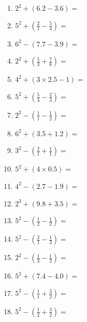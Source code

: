 \documentclass[12pt]{article}
\begin{document}
    \begin{enumerate}
\item \large $ 2^{2} + (6.2 - 3.6) = $ \vspace{1.4cm}
\item \large $ 5^{2} + (\frac{2}{1} - \frac{5}{4}) = $ \vspace{1.4cm}
\item \large $ 6^{2} - (7.7 - 3.9) = $ \vspace{1.4cm}
\item \large $ 2^{2} + (\frac{5}{3} + \frac{7}{6}) = $ \vspace{1.4cm}
\item \large $ 4^{2} + (3 \times 2.5 - 1) = $ \vspace{1.4cm}
\item \large $ 5^{2} + (\frac{5}{3} - \frac{2}{3}) = $ \vspace{1.4cm}
\item \large $ 2^{2} - (\frac{1}{1} - \frac{1}{2}) = $ \vspace{1.4cm}
\item \large $ 6^{2} + (3.5 + 1.2) = $ \vspace{1.4cm}
\newpage
\item \large $ 3^{2} - (\frac{2}{1} + \frac{1}{1}) = $ \vspace{1.4cm}
\item \large $ 5^{2} + (4 \times 0.5) = $ \vspace{1.4cm}
\item \large $ 4^{2} - (2.7 - 1.9) = $ \vspace{1.4cm}
\item \large $ 2^{3} + (9.8 + 3.5) = $ \vspace{1.4cm}
\item \large $ 5^{2} - (\frac{1}{2} - \frac{1}{2}) = $ \vspace{1.4cm}
\item \large $ 5^{2} - (\frac{2}{1} - \frac{1}{3}) = $ \vspace{1.4cm}
\item \large $ 2^{2} - (\frac{1}{3} - \frac{1}{3}) = $ \vspace{1.4cm}
\item \large $ 5^{2} + (7.4 - 4.0) = $ \vspace{1.4cm}
\item \large $ 5^{2} - (\frac{1}{1} + \frac{3}{2}) = $ \vspace{1.4cm}
\item \large $ 5^{2} - (\frac{1}{2} + \frac{3}{2}) = $ \vspace{1.4cm}

\end{enumerate}
\end{document}

